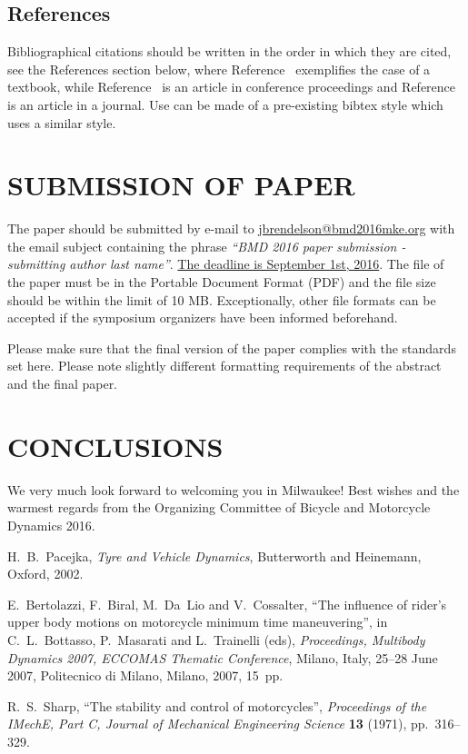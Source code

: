 \documentclass{bmd2016p}
\begin{document}
\subsection{References}

Bibliographical citations should be written in the order in which they are 
cited, see the References section below, where Reference~\cite{Pac02} 
exemplifies the case of a textbook, while Reference~\cite{Ber07} is an article 
in conference proceedings and Reference~\cite{Sha71} is an article in a 
journal. Use can be made of a pre-existing bibtex style which uses a similar 
style.


\section{SUBMISSION OF PAPER}

The paper should be submitted by e-mail to \href{mailto:jbrendelson@bmd2016mke.org}{jbrendelson@bmd2016mke.org} with the email subject containing the phrase \textit{``BMD 2016 paper submission - submitting author last name''}. \uline{The deadline is September 1st, 2016}. The file of the paper must be in the Portable Document Format (PDF) and the file size should be within the limit of 10 MB. Exceptionally, other file formats can be accepted if the symposium organizers have been informed beforehand. 

Please make sure that the final version of the paper complies with the standards set here. Please note slightly different formatting requirements of the abstract and the final paper.

\section{CONCLUSIONS}

We very much look forward to welcoming you in Milwaukee! Best wishes and the 
warmest regards from the Organizing Committee of Bicycle and Motorcycle 
Dynamics 2016.

% 
% 
\begin{thebibliography}{6}
 H.~B.~Pacejka,
\textit{Tyre and Vehicle Dynamics},
Butterworth and Heinemann, Oxford, 2002.

 E.~Bertolazzi, F.~Biral, M.~Da~Lio and V.~Cossalter,
``The influence of rider's upper body motions on motorcycle minimum time
  maneuvering'',
in C.~L.~Bottasso, P.~Masarati and L.~Trainelli (eds),
\textit{Proceedings, Multibody Dynamics 2007, ECCOMAS Thematic Conference},
Milano, Italy, 25--28 June 2007,
Politecnico di Milano, Milano, 2007, 15~pp.

 R.~S.~Sharp,
``The stability and control of motorcycles'',
\textit{Proceedings of the IMechE, Part C, Journal of Mechanical Engineering
  Science} \textbf{13} (1971), pp.~316--329.


\end{thebibliography}
\end{document}
